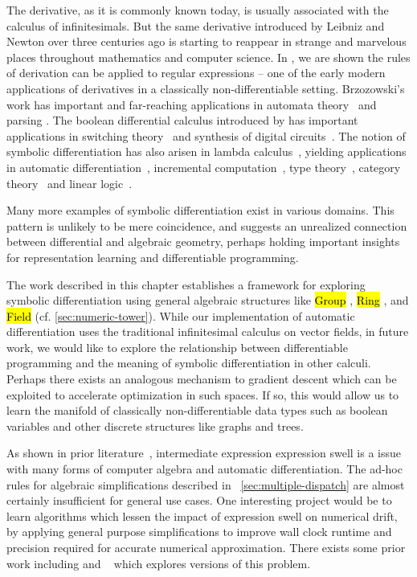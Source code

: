 \documentclass[12pt,initial,twoside,maitrise]{dms}
\newcommand{\inline}[1]{%
\begingroup%
\sethlcolor{slightgray}%
\hl{\ttfamily\small #1}%
\endgroup
}
\numberwithin{equation}{section}
\numberwithin{table}{chapter}
\numberwithin{figure}{chapter}
\begin{document}
The derivative, as it is commonly known today, is usually associated with the calculus of infinitesimals. But the same derivative introduced by Leibniz and Newton over three centuries ago is starting to reappear in strange and marvelous places throughout mathematics and computer science. In \citet{brzozowski1964derivatives}, we are shown the rules of derivation can be applied to regular expressions -- one of the early modern applications of derivatives in a classically non-differentiable setting. Brzozowski's work has important and far-reaching applications in automata theory~\citep{berry1986regex, antimirov1996partial, champarnaud1999regular} and parsing \citep{might2011parsing, moss2014derivatives}. The boolean differential calculus introduced by \citet{thayse1981boolean} has important applications in switching theory~\citep{thayse1973boolean} and synthesis of digital circuits~\citep{steinbach2017boolean}. The notion of symbolic differentiation has also arisen in lambda calculus~\citep{ehrhard2003differential}, yielding applications in automatic differentiation~\citep{kelly2016evolving}, incremental computation~\citep{cai2014theory, alvarezpicallo2019fixing}, type theory~\citep{mcbride2001derivative, mcbride2008clowns, chen2012type}, category theory~\citep{blute2006differential} and linear logic~\citep{ehrhard2018introduction, clift2018derivatives}.

Many more examples of symbolic differentiation exist in various domains. This pattern is unlikely to be mere coincidence, and suggests an unrealized connection between differential and algebraic geometry, perhaps holding important insights for representation learning and differentiable programming.

The work described in this chapter establishes a framework for exploring symbolic differentiation using general algebraic structures like \inline{Group}, \inline{Ring}, and \inline{Field} (cf. \autoref{sec:numeric-tower}). While our implementation of automatic differentiation uses the traditional infinitesimal calculus on vector fields, in future work, we would like to explore the relationship between differentiable programming and the meaning of symbolic differentiation in other calculi. Perhaps there exists an analogous mechanism to gradient descent which can be exploited to accelerate optimization in such spaces. If so, this would allow us to learn the manifold of classically non-differentiable data types such as boolean variables and other discrete structures like graphs and trees.

As shown in prior literature~\citep{theano, baydin-survey, laue2019equivalence}, intermediate expression expression swell is a issue with many forms of computer algebra and automatic differentiation. The ad-hoc rules for algebraic simplifications described in ~\autoref{sec:multiple-dispatch} are almost certainly insufficient for general use cases. One interesting project would be to learn algorithms which lessen the impact of expression swell on numerical drift, by applying general purpose simplifications to improve wall clock runtime and precision required for accurate numerical approximation. There exists some prior work including \citet{zaremba2014learning, zaremba2016learning} and ~\citet{wang2019global} which explores versions of this problem.
\end{document}
